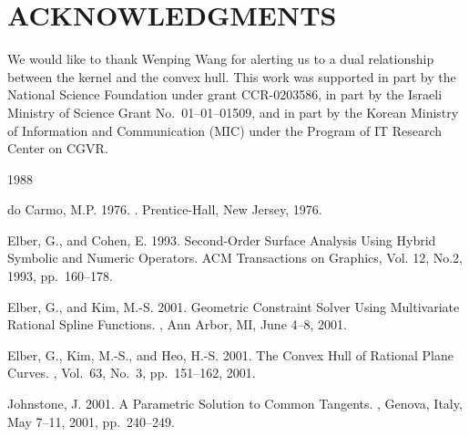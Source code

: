 \documentclass{acmsiggraph}
\begin{document}
\section*{ACKNOWLEDGMENTS}

We would like to thank Wenping Wang for alerting us
to a dual relationship between the kernel and the convex hull.
This work was supported in part by the National Science Foundation under 
grant CCR-0203586, in part by the Israeli Ministry of Science
Grant No.~01--01--01509, and in part by
the Korean Ministry of Information and Communication (MIC) under
the Program of IT Research Center on CGVR.



\begin{thebibliography}{\protect{}1988}


{\sc do Carmo, M.P. 1976.}
.
\newblock Prentice-Hall, New Jersey, 1976.

{\sc Elber, G., and Cohen, E. 1993.}
\newblock Second-Order Surface Analysis Using Hybrid Symbolic and
Numeric Operators.
\newblock ACM Transactions on Graphics, Vol. 12, No.2, 1993, 
pp.~160--178.

{\sc Elber, G., and Kim, M.-S. 2001.}
\newblock Geometric Constraint Solver
Using Multivariate Rational Spline Functions.
,
Ann Arbor, MI, June 4--8, 2001.

{\sc Elber, G., Kim, M.-S., and Heo, H.-S. 2001.}
\newblock The Convex Hull of Rational Plane Curves.
, Vol.~63, No.~3, pp.~151--162, 2001.


{\sc Johnstone, J. 2001.}
\newblock A Parametric Solution to Common Tangents.
,
Genova, Italy, May 7--11, 2001, pp.~240--249.


\end{thebibliography}
\end{document}
